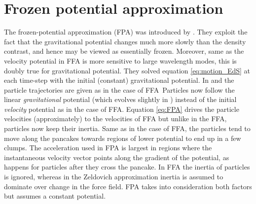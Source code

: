 \section{Frozen potential approximation}
The frozen-potential approximation (FPA) was introduced by \textcite{1994MNRAS.266..227B}. They exploit the fact that the gravitational potential changes much more slowly than the density contrast, and hence may be viewed as essentially frozen. Moreover, same as the velocity potential in FFA is more sensitive to large wavelength modes, this is doubly true for gravitational potential. They solved equation \eqref{eq:motion_EdS} at each time-step with the initial (constant) gravitational potential. In \LCDM
{}
and the particle trajectories are given as in the case of FFA\,
Particles now follow the linear \textit{gravitational} potential (which evolves slightly in \LCDM) instead of the initial \textit{velocity} potential as in the case of FFA. Equation \eqref{eq:FPA} drives the particle velocities (approximately) to the velocities of FFA but unlike in the FFA, particles now keep their inertia. Same as in the case of FFA, the particles tend to move along the pancakes towards regions of lower potential to end up in a few clumps. The acceleration used in FPA is largest in regions where the instantaneous velocity vector points along the gradient of the potential, as happens for particles after they cross the pancake. In FFA the inertia of particles is ignored, whereas in the Zeldovich approximation inertia is assumed to dominate over change in the force field. FPA takes into consideration both factors but assumes a constant potential.

